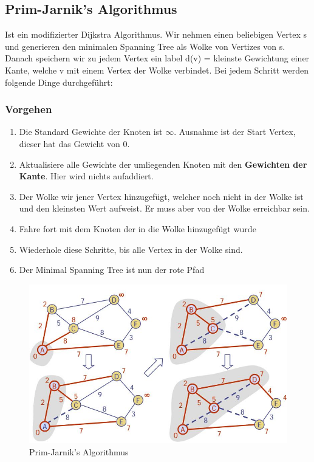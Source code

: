 \subsection{Prim-Jarnik's Algorithmus}
Ist ein modifizierter Dijkstra Algorithmus. Wir nehmen einen beliebigen Vertex s und generieren den minimalen Spanning Tree als Wolke von Vertizes von s. Danach speichern wir zu jedem Vertex ein label d(v) = kleinste Gewichtung einer Kante, welche v mit einem Vertex der Wolke verbindet. Bei jedem Schritt werden folgende Dinge durchgeführt:

\subsubsection{Vorgehen}
\begin{enumerate}
	\item Die Standard Gewichte der Knoten ist $\infty$. Ausnahme ist der Start Vertex, dieser hat das Gewicht von 0.
	\item Aktualisiere alle Gewichte der umliegenden Knoten mit den \textbf{Gewichten der Kante}. Hier wird nichts aufaddiert.
	\item Der Wolke wir jener Vertex hinzugefügt, welcher noch nicht in der Wolke ist und den kleinsten Wert aufweist. Er muss aber von der Wolke erreichbar sein.
	\item Fahre fort mit dem Knoten der in die Wolke hinzugefügt wurde
	\item Wiederhole diese Schritte, bis alle Vertex in der Wolke sind. 
	\item Der Minimal Spanning Tree ist nun der rote Pfad
\end{enumerate}

\begin{figure}[h!]
	\centering
	\includegraphics[width=0.9\linewidth]{images/prim-jarnik-algo}
	\caption{Prim-Jarnik's Algorithmus}
	\label{fig:prim-jarnik-algo}
\end{figure}

